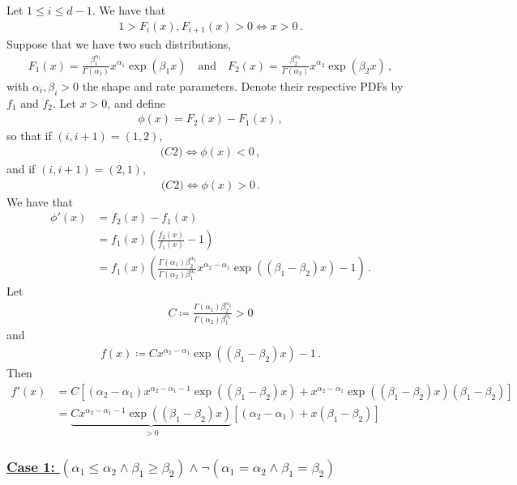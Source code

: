 \documentclass{article}
\begin{document}
%
Let $1 \leq i \leq d - 1$. We have that
%
\begin{align*}
	1 > F_i(x), F_{i+1}(x) > 0 \iff x > 0 \,.
\end{align*}
%
Suppose that we have two such distributions,
%
\begin{align*}
	F_1(x) = \frac{\beta^{\alpha_1}_1}{\Gamma(\alpha_1)} x ^ {\alpha_1}
	\exp(\beta_1 x) \quad \text{and} \quad
	F_2(x) = \frac{\beta^{\alpha_2}_2}{\Gamma(\alpha_2)} x ^ {\alpha_2}
	\exp(\beta_2 x) \,,
\end{align*}
%
with $\alpha_i, \beta_i>0$ the shape and rate parameters.
Denote their respective PDFs by $f_1$ and $f_2$.
Let $x > 0$, and define
%
\begin{align*}
	\phi(x) = F_2(x) - F_1(x) \,,
\end{align*}
%
so that if $(i, i + 1) = (1, 2)$,
%
\begin{align*}
	\textit{(C2)} \iff \phi(x) < 0 \,,
\end{align*}
%
and if $(i, i + 1) = (2, 1)$,
%
\begin{align*}
	\textit{(C2)} \iff \phi(x) > 0 \,.
\end{align*}
%
We have that
%
\begin{align*}
	\phi'(x) &= f_2(x) - f_1(x)\\
	&= f_1(x) \left(\frac{f_2(x)}{f_1(x)} - 1\right)\\
	&= f_1(x) \left(\frac{\Gamma(\alpha_1)\beta ^ {\alpha_2}_2}
		{\Gamma(\alpha_2)\beta ^ {\alpha_1}_1} x^{\alpha_2 - \alpha_1}
		\exp((\beta_1 - \beta_2) x) - 1\right) \,.
\end{align*}
%
Let
%
\begin{align*}
	C \coloneqq \frac{\Gamma(\alpha_1) \beta ^ {\alpha_2}_2}
		{\Gamma(\alpha_2) \beta ^ {\alpha_1}_1} > 0
\end{align*}
%
and
%
\begin{align*}
	f(x) \coloneqq C x ^ {\alpha_2 - \alpha_1}
		\exp((\beta_1 - \beta_2) x) - 1 \,.
\end{align*}
%
Then
%
\begin{align*}
	f'(x) &= C\left[(\alpha_2 - \alpha_1) x ^ {\alpha_2 - \alpha_1 - 1}
		\exp((\beta_1 - \beta_2) x) + x ^ {\alpha_2 - \alpha_1}
		\exp((\beta_1 - \beta_2) x)(\beta_1 - \beta_2) \right]\\
	&=\underbrace{C x ^ {\alpha_2 - \alpha_1 - 1} \exp((\beta_1 - \beta_2) x)}
		_{ > 0} \left[(\alpha_2 - \alpha_1) + x (\beta_1 - \beta_2)\right]
\end{align*}
%
\subsubsection*{\underline{Case 1:
	$(\alpha_1\leq\alpha_2\land \beta_1\geq\beta_2)
	\land\neg(\alpha_1=\alpha_2\land\beta_1=\beta_2)$}}
%
\end{document}
